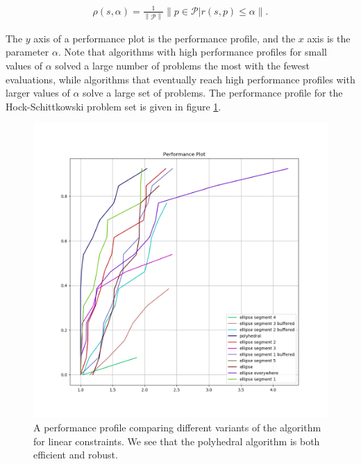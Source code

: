 \begin{align}
\rho(s, \alpha) = \frac 1 {\left\|\mathcal P \right\|} \left\|p \in \mathcal P | r(s, p) \le \alpha\right\|.
\end{align}

The $y$ axis of a performance plot is the performance profile, and the $x$ axis is the parameter $\alpha$.
Note that algorithms with high performance profiles for small values of $\alpha$ solved a large number of problems the most with the fewest evaluations, while algorithms that eventually reach high performance profiles with larger values of $\alpha$ solve a large set of problems.
The performance profile for the Hock-Schittkowski problem set is given in figure \cref{performance_profile_image}.

	
\begin{figure}[ht]
    \centering
    \includegraphics[scale=0.4]{images/performance_profile_plot.png}
    \caption[A performance profile comparing variants of the algorithm for linear constraints.]{
    	A performance profile comparing different variants of the algorithm for linear constraints.
    	We see that the polyhedral algorithm is both efficient and robust.
    }
    \label{performance_profile_image}
\end{figure}



